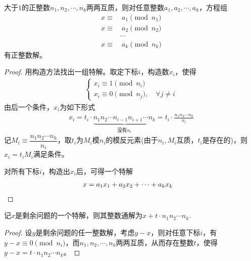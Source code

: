 \begin{theorem}
  大于$1$的正整数$n_1,n_2,\cdots, n_k$两两互质，则对任意整数$a_1,a_2,\cdots,a_k$，方程组
  \begin{align*}
    x\equiv&\ a_1\pmod{n_1}\\
    x\equiv&\ a_2\pmod{n_2}\\
    &\cdots\\
    x\equiv&\ a_k\pmod{n_k}
  \end{align*}
  有正整数解。  
\end{theorem}
\begin{proof}
  用构造方法找出一组特解。取定下标$i$，构造数$x_i$，使得
  \begin{align*}
    \begin{cases}
      x_i\equiv1\pmod{n_i}\\
      x_i\equiv0\pmod{n_j}, \quad\forall j\ne i
    \end{cases}
  \end{align*}
  由后一个条件，$x_i$为如下形式
  \begin{align*}
    x_i=t_i\cdot \underbrace{n_1n_2\cdots n_{i-1}n_{i+1}\cdots n_k}_{\text{没有}n_i}=t_i\cdot \frac{n_1n_2 \cdots n_k}{n_i}
  \end{align*}
  记$M_i\equiv\dfrac{n_1n_2\cdots n_k}{n_i}$，取$t_i$为$M_i$模$n_i$的模反元素(由于$n_i,M_i$互质，$t_i$是存在的)，则$x_i=t_iM_i$满足条件。

  对所有下标$i$，构造出$x_i$后，可得一个特解
  \begin{align*}
    x=a_1x_1+a_2x_2+\cdots+a_kx_k&\qedhere
  \end{align*}
\end{proof}

\begin{theorem}
  记$x$是剩余问题的一个特解，则其整数通解为$x+t\cdot n_1n_2\cdots n_k$.
\end{theorem}
\begin{proof}
  设$y$是剩余问题的任一整数解，考虑$y-x$，则对任意下标$i$，有$y-x\equiv0\pmod{n_i}$，而$n_1,n_2,\cdots,n_k$两两互质，从而存在整数$t$，使得$y-x=t\cdot n_1n_2\cdots n_k$。
\end{proof}